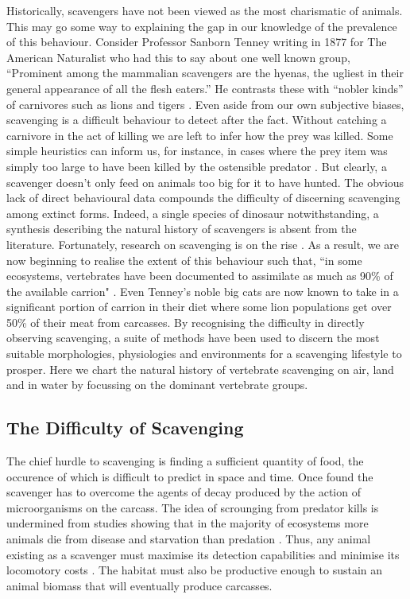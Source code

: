 \documentclass[a4paper,12pt]{article}
\begin{document}
Historically, scavengers have not been viewed as the most charismatic of animals. This may go some way to explaining the gap in our knowledge of the prevalence of this behaviour. Consider Professor Sanborn Tenney writing in 1877 for The American Naturalist who had this to say about one well known group, “Prominent among the mammalian scavengers are the hyenas, the ugliest in their general appearance of all the flesh eaters.” He contrasts these with “nobler kinds” of carnivores such as lions and tigers \citep{tenney1877few}. Even aside from our own subjective biases, scavenging is a difficult behaviour to detect after the fact. Without catching a carnivore in the act of killing we are left to infer how the prey was killed. Some simple heuristics can inform us, for instance, in cases where the prey item was simply too large to have been killed by the ostensible predator \citep{pobiner2008paleoecological}. But clearly, a scavenger doesn’t only feed on animals too big for it to have hunted. The obvious lack of direct behavioural data compounds the difficulty of discerning scavenging among extinct forms. Indeed, a single species of dinosaur notwithstanding, a synthesis describing the natural history of scavengers is absent from the literature. Fortunately, research on scavenging is on the rise \citep{manga2006vulture}. As a result, we are now beginning to realise the extent of this behaviour such that, “in some ecosystems, vertebrates have been documented to assimilate as much as 90\% of the available carrion" \citep{benbow2015introduction}. Even Tenney’s noble big cats are now known to take in a significant portion of carrion in their diet where some lion populations get over 50\% of their meat from carcasses. By recognising the difficulty in directly observing scavenging, a suite of methods have been used to discern the most suitable morphologies, physiologies and environments for a scavenging lifestyle to prosper. Here we chart the natural history of vertebrate scavenging on air, land and in water by focussing on the dominant vertebrate groups. %
\subsection*{The Difficulty of Scavenging}
The chief hurdle to scavenging is finding a sufficient quantity of food, the occurence of which is difficult to predict in space and time. Once found the scavenger has to overcome the agents of decay produced by the action of microorganisms on the carcass. The idea of scrounging from predator kills is undermined from studies showing that in the majority of ecosystems more animals die from disease and starvation than predation \citep{benbow2015introduction}. Thus, any animal existing as a scavenger must maximise its detection capabilities and minimise its locomotory costs \citep{ruxton2004obligate}. The habitat must also be productive enough to sustain an animal biomass that will eventually produce carcasses. 
\end{document}
